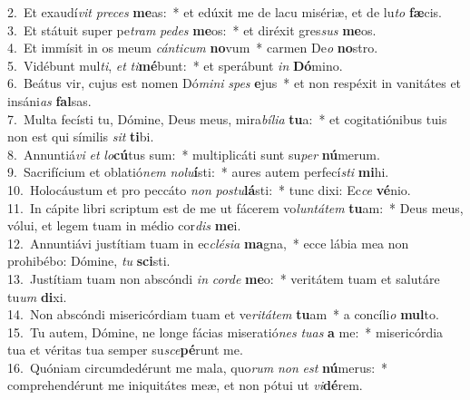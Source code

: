 {2.~}Et exaudí\textit{vit} \textit{pre}\textit{ces} \textbf{me}as:~* et edúxit me de lacu misériæ, et de lu\textit{to} \textbf{fæ}cis.\\
{3.~}Et státuit super pe\textit{tram} \textit{pe}\textit{des} \textbf{me}os:~* et diréxit gres\textit{sus} \textbf{me}os.\\
{4.~}Et immísit in os meum \textit{cán}\textit{ti}\textit{cum} \textbf{no}vum~* carmen De\textit{o} \textbf{no}stro.\\
{5.~}Vidébunt mul\textit{ti}, \textit{et} \textit{ti}\textbf{mé}bunt:~* et sperábunt \textit{in} \textbf{Dó}mino.\\
{6.~}Beátus vir, cujus est nomen Dó\textit{mi}\textit{ni} \textit{spes} \textbf{e}jus~* et non respéxit in vanitátes et insáni\textit{as} \textbf{fal}sas.\\
{7.~}Multa fecísti tu, Dómine, Deus meus, mira\textit{bí}\textit{li}\textit{a} \textbf{tu}a:~* et cogitatiónibus tuis non est qui símilis \textit{sit} \textbf{ti}bi.\\
{8.~}Annuntiá\textit{vi} \textit{et} \textit{lo}\textbf{cú}tus sum:~* multiplicáti sunt su\textit{per} \textbf{nú}merum.\\
{9.~}Sacrifícium et oblatió\textit{nem} \textit{no}\textit{lu}\textbf{í}sti:~* aures autem perfecí\textit{sti} \textbf{mi}hi.\\
{10.~}Holocáustum et pro peccáto \textit{non} \textit{po}\textit{stu}\textbf{lá}sti:~* tunc dixi: Ec\textit{ce} \textbf{vé}nio.\\
{11.~}In cápite libri scriptum est de me ut fácerem vo\textit{lun}\textit{tá}\textit{tem} \textbf{tu}am:~* Deus meus, vólui, et legem tuam in médio cor\textit{dis} \textbf{me}i.\\
{12.~}Annuntiávi justítiam tuam in ec\textit{clé}\textit{si}\textit{a} \textbf{ma}gna,~* ecce lábia mea non prohibébo: Dómine, \textit{tu} \textbf{sci}sti.\\
{13.~}Justítiam tuam non abscóndi \textit{in} \textit{cor}\textit{de} \textbf{me}o:~* veritátem tuam et salutáre tu\textit{um} \textbf{di}xi.\\
{14.~}Non abscóndi misericórdiam tuam et ve\textit{ri}\textit{tá}\textit{tem} \textbf{tu}am~* a concíli\textit{o} \textbf{mul}to.\\
{15.~}Tu autem, Dómine, ne longe fácias miseratió\textit{nes} \textit{tu}\textit{as} \textbf{a} me:~* misericórdia tua et véritas tua semper su\textit{sce}\textbf{pé}runt me.\\
{16.~}Quóniam circumdedérunt me mala, quo\textit{rum} \textit{non} \textit{est} \textbf{nú}merus:~* comprehendérunt me iniquitátes meæ, et non pótui ut \textit{vi}\textbf{dé}rem.\\
